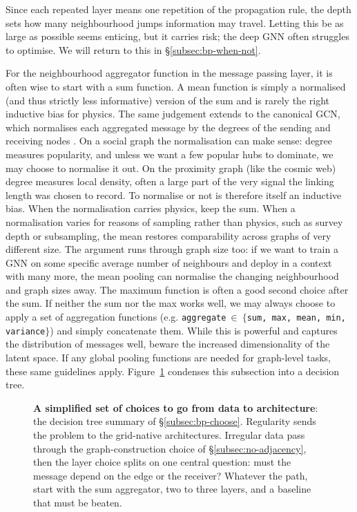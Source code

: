 \documentclass[graybox, envcountchap]{Template/svmult}
\begin{document}
Since each repeated layer means one repetition of the propagation rule, the depth sets how many neighbourhood jumps information may travel. Letting this be as large as possible seems enticing, but it carries risk; the deep GNN often struggles to optimise. We will return to this in \S\ref{subsec:bp-when-not}.

For the neighbourhood aggregator function in the message passing layer, it is often wise to start with a sum function. A mean function is simply a normalised (and thus strictly less informative) version of the sum and is rarely the right inductive bias for physics. The same judgement extends to the canonical GCN, which normalises each aggregated message by the degrees of the sending and receiving nodes \citep{Kipf2017_GCN_semisupervised}. On a social graph the normalisation can make sense: degree measures popularity, and unless we want a few popular hubs to dominate, we may choose to normalise it out. On the proximity graph (like the cosmic web) degree measures local density, often a large part of the very signal the linking length was chosen to record. To normalise or not is therefore itself an inductive bias. When the normalisation carries physics, keep the sum. When a normalisation varies for reasons of sampling rather than physics, such as survey depth or subsampling, the mean restores comparability across graphs of very different size. The argument runs through graph size too: if we want to train a GNN on some specific average number of neighbours and deploy in a context with many more, the mean pooling can normalise the changing neighbourhood and graph sizes away. The maximum function is often a good second choice after the sum. If neither the sum nor the max works well, we may always choose to apply a set of aggregation functions (e.g. \texttt{aggregate}$~\in~\{$\texttt{sum, max, mean, min, variance}$\}$) and simply concatenate them. While this is powerful and captures the distribution of messages well, beware the increased dimensionality of the latent space. If any global pooling functions are needed for graph-level tasks, these same guidelines apply. Figure~\ref{fig:flowchart} condenses this subsection into a decision tree.

\begin{figure}
\centering

\caption{\textbf{A simplified set of choices to go from data to architecture}: the decision tree summary of \S\ref{subsec:bp-choose}. Regularity sends the problem to the grid-native architectures. Irregular data pass through the graph-construction choice of \S\ref{subsec:no-adjacency}, then the layer choice splits on one central question: must the message depend on the edge or the receiver? Whatever the path, start with the sum aggregator, two to three layers, and a baseline that must be beaten. }
\label{fig:flowchart}
\end{figure}
\end{document}
